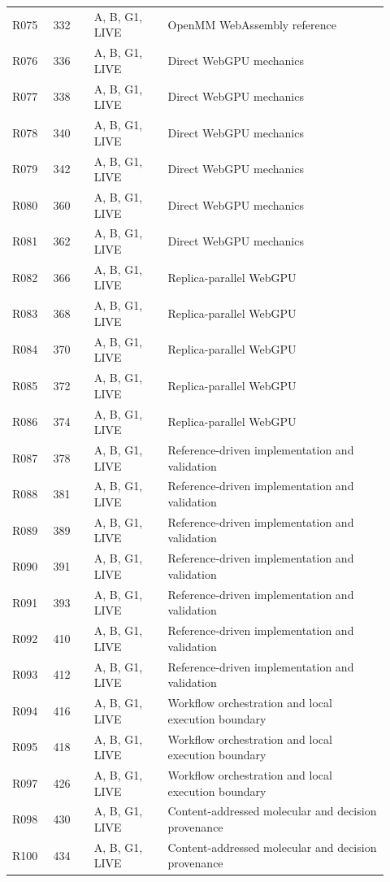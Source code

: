 \documentclass[11pt]{article}
\begin{document}
\begin{longtable}{@{}p{0.10\linewidth}p{0.10\linewidth}p{0.18\linewidth}p{0.54\linewidth}@{}}
R075 & 332 & A, B, G1, LIVE & OpenMM WebAssembly reference \\
R076 & 336 & A, B, G1, LIVE & Direct WebGPU mechanics \\
R077 & 338 & A, B, G1, LIVE & Direct WebGPU mechanics \\
R078 & 340 & A, B, G1, LIVE & Direct WebGPU mechanics \\
R079 & 342 & A, B, G1, LIVE & Direct WebGPU mechanics \\
R080 & 360 & A, B, G1, LIVE & Direct WebGPU mechanics \\
R081 & 362 & A, B, G1, LIVE & Direct WebGPU mechanics \\
R082 & 366 & A, B, G1, LIVE & Replica-parallel WebGPU \\
R083 & 368 & A, B, G1, LIVE & Replica-parallel WebGPU \\
R084 & 370 & A, B, G1, LIVE & Replica-parallel WebGPU \\
R085 & 372 & A, B, G1, LIVE & Replica-parallel WebGPU \\
R086 & 374 & A, B, G1, LIVE & Replica-parallel WebGPU \\
R087 & 378 & A, B, G1, LIVE & Reference-driven implementation and validation \\
R088 & 381 & A, B, G1, LIVE & Reference-driven implementation and validation \\
R089 & 389 & A, B, G1, LIVE & Reference-driven implementation and validation \\
R090 & 391 & A, B, G1, LIVE & Reference-driven implementation and validation \\
R091 & 393 & A, B, G1, LIVE & Reference-driven implementation and validation \\
R092 & 410 & A, B, G1, LIVE & Reference-driven implementation and validation \\
R093 & 412 & A, B, G1, LIVE & Reference-driven implementation and validation \\
R094 & 416 & A, B, G1, LIVE & Workflow orchestration and local execution boundary \\
R095 & 418 & A, B, G1, LIVE & Workflow orchestration and local execution boundary \\
R097 & 426 & A, B, G1, LIVE & Workflow orchestration and local execution boundary \\
R098 & 430 & A, B, G1, LIVE & Content-addressed molecular and decision provenance \\
R100 & 434 & A, B, G1, LIVE & Content-addressed molecular and decision provenance \\

\end{longtable}
\end{document}
